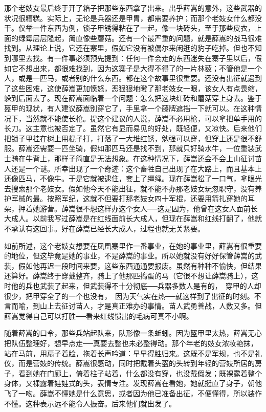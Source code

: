那个老妓女最后终于开了箱子把那些东西拿了出来。出乎薛嵩的意外，这些武器的状况很糟糕。实际上，无论是兵器还是甲胄，都需要养护；而那个老妓女什么都没干。仅举一件东西为例，锁子甲锈得粘在了一起，像一块砖头，至于那些皮衣，上面的绿霉层层隆起，简直像些蘑菇。还有一个最严重的问题，就是薛嵩的战马很难找到。从理论上说，它还在寨里，假如它没有被偶尔来闲逛的豹子吃掉。但也不知到哪里去找。有一件事必须预先提到：任何一件会走的东西迷失在寨子里以后，假如它不想出来，都很难找到，因为这寨子是大得不得了的一片林薮；不管他是一个人，或是一匹马，或者别的什么东西。都在这个故事里很重要。还没有出征就遇到了这些困难，这使薛嵩更加愤怒，恶狠狠地瞪了那老妓女一眼，该女人有点畏缩，躲到后面去了。现在薛嵩面临着一个问题：怎么把这块红砖和蘑菇穿上身去。鉴于盔甲的现状，有人建议薛嵩别穿它了，手里拿一个藤牌遮挡一下就可以。在这种情况下，当然就不能使长枪。提这个建议的人说，薛嵩不必用枪，可以拿把单手用的长刀。这主意也被否定了。虽然它有显而易见的好处，既轻便，又凉快。后来他们把锁子甲挂在树上用棍子打，打落了一大堆红锈，勉强可以穿，但穿上还是很不舒服。薛嵩还需要一匹坐骑，假如那匹马还是找不到，那就只好骑水牛，一位重装武士骑在牛背上，那样子简直是无法想象。在这种情况下，薛嵩还会不会上山征讨苗人还是一个谜。所幸出现了一个奇迹：这个畜牲自己出现了在大路上，而且基本上还像匹马，不像牛。于是它就被逮住，套上了缰绳。现在薛嵩松了一口气，拿眼光去搜索那个老妓女。假如他今天不能出征，就不能不办那老妓女玩忽职守，没有养护军械的最。按照军纪，这就不但要打那老妓女四十军棍，还要用箭扎穿她的耳朵，押着她游营。薛嵩很不想这样办这个女人──这是因为，他曾在这女人面前长大成人。以前我写过薛嵩是在红线面前长大成人，但现在薛嵩和红线打翻了，他就不承认有这回事。好在薛嵩已经长大成人，过程也就无关紧要。 

如前所述，这个老妓女想要在凤凰寨里作一番事业，在她的事业里，薛嵩有很重要的地位，但这毕竟是她的事业，不是薛嵩的事业。所以她就没有好好保管薛嵩的武装，假如他再迟一段时间来要，这些东西通通要报废。虽然有种种不愉快，但结果还算好。薛嵩终于穿戴整齐，骑上了他那匹捣蛋的马（它很不想让薛嵩骑上），这时他的兵也武装了起来，但武装得不十分彻底──兵器多数人是有的，　穿甲的人却很少，把甲穿全了的一个也没有，　因为天气实在热──就这样到了出征的时刻。不言而喻，到山上去征讨苗人，才是真正难办的事情。苗人武勇善战，人数又多。但薛嵩觉得自己可以打胜──看来红线惯出的毛病可真不小啊。 

随着薛嵩的口令，那些兵站起队来，队形像一条蚯蚓。因为盔甲里太热，薛嵩无心把队伍整理好，想早点走──真要去整也未必整得动。那个年老的妓女浓妆艳抹，站在马前，用扇子着脸，拖着长声吟道：早早得胜归来。这既不是军规，也不是礼仪，而是营妓的传统。薛嵩很感动，同时把戴着头盔的头转到年轻的营妓所居的房子，看到她在门廊上，倚着柱子站着，什么都没有穿，也没戴假发；既裸露着整个身体，又裸露着娃娃式的头，表情专注。发现薛嵩在看她，她就挺直了身子，朝他飞了一吻。薛嵩不懂她是什么意思，或者因为他已准备出征，不便懂得，所以装作不懂。这种表示远不能令人振奋。后来他们就出发了。 

